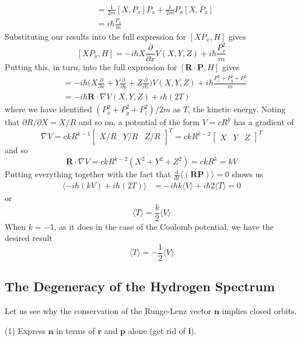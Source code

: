 \documentclass[../principles-of-quantum-mechanics.tex]{subfiles}
\begin{document}
\begin{questions}
\begin{solution}
\begin{align*}
			&= \frac{1}{2m}[X, P_x]P_x + \frac{1}{2m}P_x[X, P_x] \\
			&= i\hbar\frac{P_x}{m}
		\end{align*}
		Substituting our results into the full expression for $[XP_x, H]$ gives
		$$[XP_x, H] = -i\hbar X\frac{\partial}{\partial x}V(X, Y, Z) + i\hbar\frac{P_x^2}{m}$$
		Putting this, in turn, into the full expression for $[\mathbf{R}\cdot\mathbf{P}, H]$ gives
		\begin{align*}
			[\mathbf{R}\cdot\mathbf{P}, H] &= -i\hbar\Big(X\frac{\partial}{\partial x} + Y\frac{\partial}{\partial y} + Z\frac{\partial}{\partial z}\Big)V(X, Y, Z) + i\hbar\frac{P_x^2 + P_y^2 + P_z^2}{m} \\
			&= -i\hbar \mathbf{R}\cdot\nabla V(X, Y, Z) + i\hbar(2T)
		\end{align*}
		where we have identified $(P_x^2 + P_y^2 + P_z^2)/ 2m$ as $T$, the kinetic energy. Noting that $\partial R/\partial X = X/R$ and so on, a potential of the form $V = cR^k$ has a gradient of
		$$\nabla V = ckR^{k-1}\begin{bmatrix}X/R & Y/R & Z/R\end{bmatrix}^T = ckR^{k-2}\begin{bmatrix}X & Y & Z\end{bmatrix}^T$$
		and so
		$$\mathbf{R}\cdot\nabla V = ckR^{k - 2}(X^2 + Y^2 + Z^2) = ckR^k = kV$$
		Putting everything together with the fact that $\tfrac{\mathrm{d}}{\mathrm{d}t}\langle \dot{(\mathbf{R}\mathbf{P})}\rangle = 0$ shows us
		\begin{align*}
			\langle -i\hbar(kV) + i\hbar(2T)\rangle &= -i\hbar k\langle V\rangle + i\hbar 2\langle T\rangle = 0
		\end{align*}
		or
		$$\langle T\rangle = \frac{k}{2}\langle V\rangle$$
		When $k = -1$, as it does in the case of the Coulomb potential, we have the desired result
		$$\langle T\rangle = -\frac{1}{2}\langle V\rangle$$
	\end{solution}

	\setcounter{subsection}{1}
	\subsection{The Degeneracy of the Hydrogen Spectrum}
	\setcounter{question}{0}
	\question Let us see why the conservation of the Runge-Lenz vector $\mathbf{n}$ implies closed orbits.
	
	(1) Express $\mathbf{n}$ in terms of $\mathbf{r}$ and $\mathbf{p}$ alone (get rid of $\mathbf{l}$).
	

\end{questions}
\end{document}
